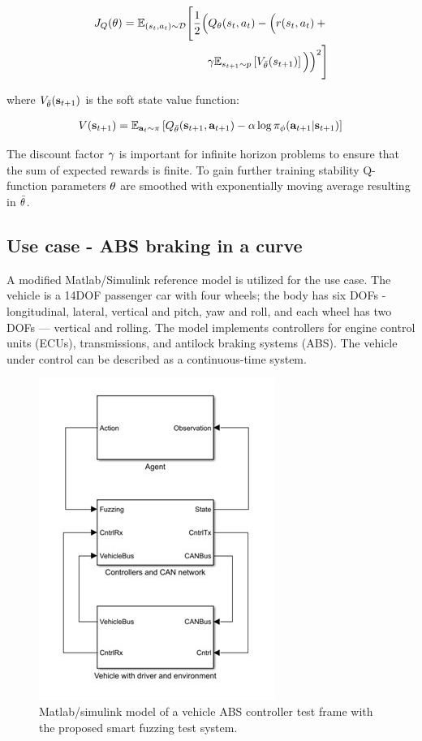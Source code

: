 \documentclass[a4paper, fleqn]{cas-dc}
\begin{document}
	\begin{align}				
		J_Q(\theta) = \mathbb{E}_{(s_t,a_t)\sim\mathcal{D}} \Bigg[ \frac{1}{2} \Big( Q_\theta(s_t, a_t) - \Big( r(s_t,a_t) + {} \notag \\
		\gamma \mathbb{E}_{s_{t+1}\sim p} \left[ V_{\bar{\theta}}(s_{t+1}) \right] \Big) \Big)^2 \Bigg]							
		\label{eq:q_cost}		
	\end{align}
	
	where $V_{\bar{\theta}}({\mathbf{s}_{t+1}})$ is the soft state value function:
	
	\begin{align}
		V({\mathbf{s}_{t+1}}) = \operatorname{\mathbb{E}}_{{\mathbf{a}_t}\sim\pi}\left[Q_{\bar{\theta}}({\mathbf{s}_{t+1}}, {\mathbf{a}_{t+1}}) - \alpha\log\pi_{\phi}({\mathbf{a}_{t+1}}|{\mathbf{s}_{t+1}})\right]
	\end{align}
	
	The discount factor $\gamma$ is important for infinite horizon problems to ensure that the sum of expected rewards is finite. To gain further training stability Q-function parameters $\theta$ are smoothed with exponentially moving average resulting in $\bar{\theta}$.
		
	\subsection{Use case - ABS braking in a curve}
	
	A modified Matlab/Simulink reference model is utilized for the use case. The vehicle is a 14DOF passenger car with four wheels; the body has six DOFs - longitudinal, lateral, vertical and pitch, yaw and roll, and each wheel has two DOFs — vertical and rolling. The model implements controllers for engine control units (ECUs), transmissions, and antilock braking systems (ABS). The vehicle under control can be described as a continuous-time system. 
	
	\begin{figure}[h]
		\centering
		\includegraphics[width=.6\columnwidth]{figures/actualmodel.jpg}
		\caption{Matlab/simulink model of a vehicle ABS controller test frame with the proposed smart fuzzing test system.}
		\label{FIG:ABS_Simulink}
	\end{figure}
	
\end{document}
